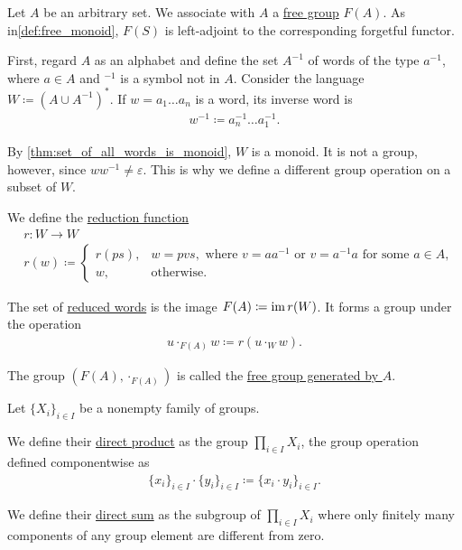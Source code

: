 \begin{definition}\label{def:free_group}\cite[306]{Knapp2016BAlg}
  Let $A$ be an arbitrary set. We associate with $A$ a \ul{free group} $F(A)$. As in\cref{def:free_monoid}, $F(S)$ is left-adjoint to the corresponding forgetful functor.

  First, regard $A$ as an alphabet and define the set $A^{-1}$ of words of the type $a^{-1}$, where $a \in A$ and $\mbox{}^{-1}$ is a symbol not in $A$. Consider the language $W \coloneqq (A \cup A^{-1})^{*}$. If $w = a_1 \ldots a_n$ is a word, its inverse word is
  \begin{align*}
    w^{-1} \coloneqq a_n^{-1} \ldots a_1^{-1}.
  \end{align*}

  By \cref{thm:set_of_all_words_is_monoid}, $W$ is a monoid. It is not a group, however, since $w w^{-1} \neq \varepsilon$. This is why we define a different group operation on a subset of $W$.

  We define the \ul{reduction function}
  \begin{align*}
    &r: W \to W \\
    &r(w) \coloneqq \begin{cases}
      r(ps), &w = pvs, \text{ where } v = aa^{-1} \text{ or } v = a^{-1}a \text{ for some } a \in A, \\
      w, &\text{otherwise}.
    \end{cases}
  \end{align*}

  The set of \ul{reduced words} is the image $F(A) \coloneqq \operatorname{im} r(W)$. It forms a group under the operation
  \begin{align*}
    u \cdot_{F(A)} w \coloneqq r(u \cdot_{W} w).
  \end{align*}

  The group $(F(A), \cdot_{F(A)})$ is called the \ul{free group generated by $A$}.
\end{definition}

\begin{definition}\label{def:group_direct_product}
  Let $\{ X_i \}_{i \in I}$ be a nonempty family of groups.

  We define their \ul{direct product} as the group $\prod_{i \in I} X_i$, the group operation defined componentwise as
  \begin{align*}
    \{ x_i \}_{i \in I} \cdot \{ y_i \}_{i \in I}
    \coloneqq
    \{ x_i \cdot y_i \}_{i \in I}.
  \end{align*}

  We define their \ul{direct sum} as the subgroup of $\prod_{i \in I} X_i$ where only finitely many components of any group element are different from zero.
\end{definition}

